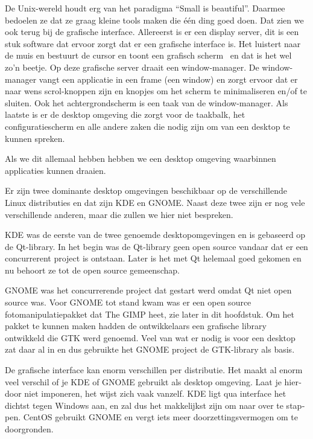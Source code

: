 De Unix-wereld houdt erg van het paradigma ``Small is beautiful''. Daarmee bedoelen ze dat ze
graag kleine tools maken die \'e\'en ding goed doen. Dat zien we ook terug bij de grafische interface. Allereerst is er
een display server, dit is een stuk software dat ervoor zorgt dat er een grafische interface is. Het luistert naar de
muis en bestuurt de cursor en toont een grafisch scherm \ en dat is het wel zo'n beetje. Op deze grafische server
draait een window-manager. De window-manager vangt een applicatie in een frame (een window) en zorgt ervoor dat er naar
wens scrol-knoppen zijn en knopjes om het scherm te minimaliseren en/of te sluiten. Ook het achtergrondscherm is een
taak van de window-manager. Als laatste is er de desktop omgeving die zorgt voor de taakbalk, het configuratiescherm en
alle andere zaken die nodig zijn om van een desktop te kunnen spreken.

{
Als we dit allemaal hebben hebben we een desktop omgeving waarbinnen applicaties kunnen draaien.}

{
Er zijn twee dominante desktop omgevingen beschikbaar op de verschillende Linux distributies en dat zijn KDE en GNOME.
Naast deze twee zijn er nog vele verschillende anderen, maar die zullen we hier niet bespreken.}

{
\foreignlanguage{dutch}{KDE was de eerste van de twee genoemde desktopomgevingen en is gebaseerd op de Qt-library. In
het begin was de Qt-library geen open source vandaar dat er een concurrerent project is ontstaan. Later is het met Qt
helemaal goed gekomen en nu behoort ze tot de open source gemeenschap.}}

{
GNOME was het concurrerende project dat gestart werd omdat Qt niet open source was. Voor GNOME tot stand kwam was er een
open source fotomanipulatiepakket dat The GIMP heet, zie later in dit hoofdstuk. Om het pakket te kunnen
maken hadden de ontwikkelaars een grafische library ontwikkeld die GTK werd genoemd. Veel van wat er nodig is voor een
desktop zat daar al in en dus gebruikte het GNOME project de GTK-library als basis.}

{
\foreignlanguage{dutch}{De grafische interface kan enorm verschillen per distributie. Het maakt al enorm veel verschil
of je KDE of GNOME gebruikt als desktop omgeving. Laat je hierdoor niet imponeren, het wijst zich vaak vanzelf. KDE
ligt qua interface het dichtst tegen Windows aan, en zal dus het makkelijkst zijn om naar over te stappen. CentOS
gebruikt GNOME en vergt iets meer doorzettingsvermogen om te doorgronden.}}

